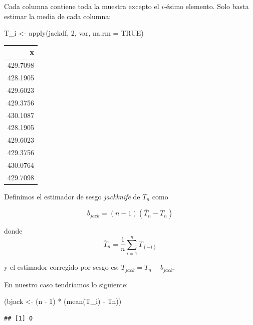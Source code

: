 \documentclass[
  12pt,
]{book}
\newenvironment{Shaded}{\begin{snugshade}}{\end{snugshade}}
\newcommand{\AttributeTok}[1]{\textcolor[rgb]{0.77,0.63,0.00}{#1}}
\newcommand{\ConstantTok}[1]{\textcolor[rgb]{0.00,0.00,0.00}{#1}}
\newcommand{\DecValTok}[1]{\textcolor[rgb]{0.00,0.00,0.81}{#1}}
\newcommand{\FunctionTok}[1]{\textcolor[rgb]{0.00,0.00,0.00}{#1}}
\newcommand{\NormalTok}[1]{#1}
\newcommand{\OtherTok}[1]{\textcolor[rgb]{0.56,0.35,0.01}{#1}}
\newcommand{\SpecialCharTok}[1]{\textcolor[rgb]{0.00,0.00,0.00}{#1}}
\begin{document}
Cada columna contiene toda la muestra excepto el \(i\)-ésimo elemento.
Solo basta estimar la media de cada columna:

\begin{Shaded}
\begin{Highlighting}[]
\NormalTok{T\_i }\OtherTok{\textless{}{-}} \FunctionTok{apply}\NormalTok{(jackdf, }\DecValTok{2}\NormalTok{, var, }\AttributeTok{na.rm =} \ConstantTok{TRUE}\NormalTok{)}
\end{Highlighting}
\end{Shaded}

\begin{longtable}[]{@{}r@{}}
\toprule()
x \\
\midrule()
\endhead
429.7098 \\
428.1905 \\
429.6023 \\
429.3756 \\
430.1087 \\
428.1905 \\
429.6023 \\
429.3756 \\
430.0764 \\
429.7098 \\
\bottomrule()
\end{longtable}

Definimos el estimador de sesgo \emph{jackknife} de \(T_n\) como

\begin{equation*}
b_{jack} = (n-1) (\overline{T}_{n} - T_{n})
\end{equation*}

donde \begin{equation*}
\overline{T}_{n} = \frac{1}{n} \sum_{i=1}^{n} T_{(-i)}
\end{equation*}

y el estimador corregido por sesgo es: \(T_{jack}=T_n-b_{jack}\).

En nuestro caso tendríamos lo siguiente:

\begin{Shaded}
\begin{Highlighting}[]
\NormalTok{(bjack }\OtherTok{\textless{}{-}}\NormalTok{ (n }\SpecialCharTok{{-}} \DecValTok{1}\NormalTok{) }\SpecialCharTok{*}\NormalTok{ (}\FunctionTok{mean}\NormalTok{(T\_i) }\SpecialCharTok{{-}}\NormalTok{ Tn))}
\end{Highlighting}
\end{Shaded}

\begin{verbatim}
## [1] 0
\end{verbatim}
\end{document}
